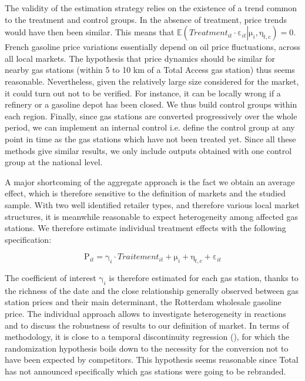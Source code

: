 \documentclass[english]{article}
\begin{document}
The validity of the estimation strategy relies on the existence of a trend common to the treatment and control groups. In the absence of treatment, price trends would have then been similar. This means that
$\mathbb{E}\left(Treatment_{it}\cdot\mathrm{\varepsilon}_{it}\left|\mathrm{\mu}_{i},\mathrm{\eta}_{t,c}\right.\right)=0$. French gasoline price variations essentially depend on oil price fluctuations, across all local markets. The hypothesis that price dynamics should be similar for nearby gas stations (within 5 to 10 km of a Total Access gas station) thus seems reasonable. Nevertheless, given the relatively large size considered for the market, it could turn out not to be verified. For instance, it can be locally wrong if a refinery or a gasoline depot has been closed. We thus build control groups within each region. Finally, since gas stations are converted progressively over the whole period, we can implement an internal control i.e. define the control group at any point in time as the gas stations which have not been treated yet. Since all these methods give similar results, we only include outputs obtained with one control group at the national level.
\medskip{}

A major shortcoming of the aggregate approach is the fact we obtain an average effect, which is therefore sensitive to the definition of markets and the studied sample. With two well identified retailer types, and therefore various local market structures, it is meanwhile reasonable to expect heterogeneity among affected gas stations. We therefore estimate individual treatment effects with the following specification:

\begin{equation}
\mathrm{P}_{it}=\mathrm{\gamma}_{i}\cdot Traitement_{it}+\mathrm{\mu}_{i}+\mathrm{\eta}_{t,c}+\mathrm{\varepsilon}_{it}\label{eq:2}
\end{equation}

\medskip{}

The coefficient of interest $\mathrm{\gamma}_{i}$ is therefore estimated for each gas station, thanks to the richness of the date and the close relationship generally observed between gas station prices and their main determinant, the Rotterdam wholesale gasoline price. The individual approach allows to investigate heterogeneity in reactions and to discuss the robustness of results to our definition of market. In terms of methodology, it is close to a temporal discontinuity regression (\cite{AUF11}), for which the randomization hypothesis boils down to the necessity for the conversion not to have been expected by competitors. This hypothesis seems reasonable since Total has not announced specifically which gas stations were going to be rebranded.\medskip{}
\end{document}

